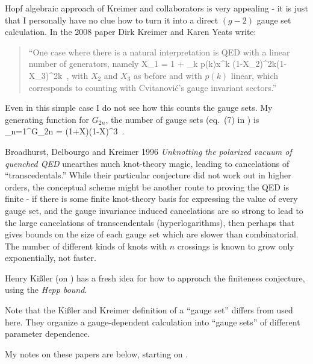 Hopf algebraic approach of Kreimer and collaborators is very appealing - it is just that I
personally have no clue how to turn it into a direct $(g-2)$ gauge set
calculation. In the 2008 paper
 {Dirk Kreimer} and
{Karen Yeats} write:
    \begin{quote}
``One case where there is a natural interpretation is QED with a linear
number of generators, namely
\beq
X_1 = 1 + \sum_{k }p(k)x^k
           {(1-X_2)^{2k}(1-X_3)^{2k}}
\,,
with $X_2$ and $X_3$ as before and with $p(k)$ linear, which corresponds
to counting with Cvitanovi\'c's gauge invariant sectors.''
    \end{quote}
Even in this simple case I do not see how this counts the gauge sets. My
generating function for $G_{2n}$, the number of gauge sets
(eq.~(7) in )  is
\beq
\sum_{n=1}^\infty G_{2n}
    =
           {(1+X)(1-X)^{3}}
\,.

Broadhurst, Delbourgo and Kreimer 1996 {\em Unknotting the
polarized vacuum of quenched {QED}} unearthes much knot-theory magic,
leading to cancelations of ``transcedentals.'' While their
particular conjecture did not work out
in higher orders, the conceptual scheme might be another
route to proving the QED is finite - if there is some finite knot-theory
basis for expressing the value of every gauge set, and the gauge
invariance induced cancelations are so strong to lead to the large
cancelations of transcendentals (hyperlogarithms), then perhaps that
gives bounds on the size of each gauge set which are slower than
combinatorial. The number of different kinds of knots with $n$ crossings
is known to grow only exponentially, not faster.

Henry Ki{\ss}ler (on ) has a fresh idea for how to
approach the finiteness conjecture, using the \emph{Hepp bound}.

Note that the Ki{\ss}ler and Kreimer definition of a ``gauge
set'' differs from  used here. They organize a
gauge-dependent calculation into ``gauge sets'' of different parameter
dependence.

My notes on these papers are below, starting on .

    


